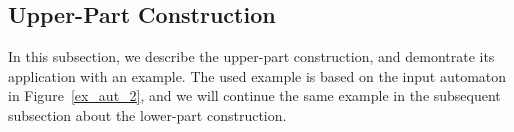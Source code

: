 



\subsection{Upper-Part Construction}
\label{3_upper_part}
In this subsection, we describe the upper-part construction, and demontrate its application with an example. The used example is based on the input automaton in Figure~\ref{ex_aut_2}, and we will continue the same example in the subsequent subsection  about the lower-part construction.

